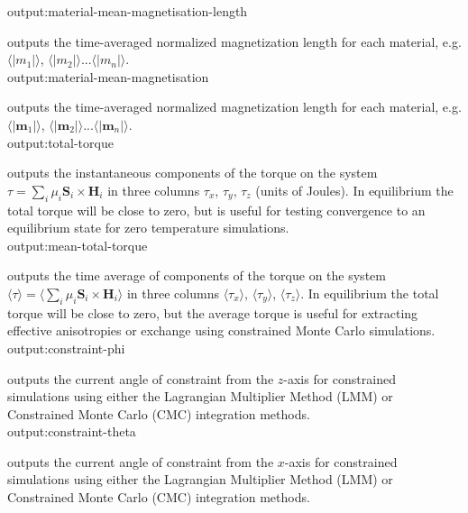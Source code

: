 {\zicf output:material-mean-magnetisation-length}
outputs the time-averaged normalized magnetization length for each material, e.g. $\langle|m_1|\rangle$, $\langle|m_2|\rangle$...$\langle|m_n|\rangle$.\\

{\zicf output:material-mean-magnetisation}
outputs the time-averaged normalized magnetization length for each material, e.g. $\langle|\mathbf{m}_1|\rangle$,
$\langle|\mathbf{m}_2|\rangle$...$\langle|\mathbf{m}_n|\rangle$.\\

{\zicf output:total-torque}
outputs the instantaneous components of the torque on the system $\tau = \sum_i
\mu_i \mathbf{S}_i \times \mathbf{H}_i$ in three columns $\tau_x$, $\tau_y$,
$\tau_z$ (units of Joules). In equilibrium the total torque will be close to zero,
but is useful for testing convergence to an equilibrium state for zero temperature simulations.\\

{\zicf output:mean-total-torque}
outputs the time average of components of the torque on the system $\langle\tau\rangle =
\langle\sum_i \mu_i \mathbf{S}_i \times \mathbf{H}_i \rangle$ in three columns $\langle\tau_x
\rangle$, $\langle\tau_y \rangle$, $\langle\tau_z \rangle$. In equilibrium the total torque
will be close to zero, but the average torque is useful for extracting effective anisotropies
or exchange using constrained Monte Carlo simulations.\\

{\zicf output:constraint-phi} outputs
the current angle of constraint from the $z$-axis for constrained simulations using either the
Lagrangian Multiplier Method (LMM) or Constrained Monte Carlo (CMC) integration methods.\\

{\zicf output:constraint-theta}
outputs the current angle of constraint from the $x$-axis for constrained simulations using
either the Lagrangian Multiplier Method (LMM) or Constrained Monte Carlo (CMC) integration methods.\\


